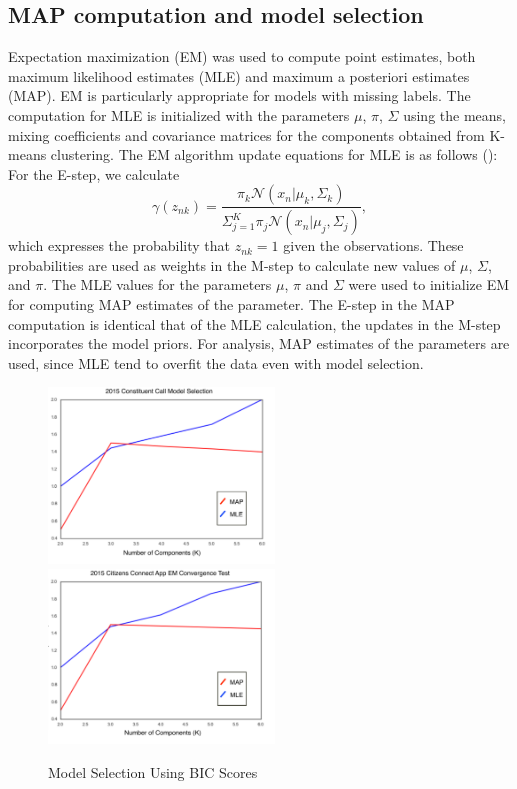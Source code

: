 \documentclass[twoside]{article}
\newcommand{\N}{\mathcal{N}}
\theoremstyle{theorem}
\theoremstyle{theorem}
\theoremstyle{theorem}
\theoremstyle{lemma}
\theoremstyle{definition}
\theoremstyle{example}
\begin{document}
\subsection{MAP computation and model selection}
Expectation maximization (EM) was used to compute point estimates, both maximum likelihood estimates (MLE) and maximum a posteriori estimates (MAP). EM is particularly appropriate for models with missing labels. The computation for MLE is initialized with the parameters $\mu$, $\pi$, $\Sigma$ using the means, mixing coefficients and covariance matrices for the components obtained from K-means clustering. The EM algorithm update equations for MLE is as follows (\cite{Bishop}): 
For the E-step, we calculate   
\begin{equation}
\gamma{(z_{nk})} = \frac{\pi_k \N(x_n| \mu_k, \Sigma_k)}{\Sigma_{j=1}^K \pi_j \N(x_n| \mu_j, \Sigma_j)},
\end{equation}
which expresses the probability that $z_{nk}=1$ given the observations. These probabilities are used as weights in the M-step to calculate new values of $\mu$, $\Sigma$, and $\pi$. The MLE values for the parameters $\mu$, $\pi$ and $\Sigma$ were used to initialize EM for computing MAP estimates of the parameter. The E-step in the MAP computation is identical that of the MLE calculation, the updates in the M-step incorporates the model priors. For analysis, MAP estimates of the parameters are used, since MLE tend to overfit the data even with model selection. 
\begin{figure}[h!]
\begin{center}
\includegraphics[width=60mm]{Call_bic}
\includegraphics[width=60mm]{App_bic}
\caption{Model Selection Using BIC Scores}\label{fig:bic}
\end{center}
\vskip -0.2in
\end{figure} 
\end{document}
